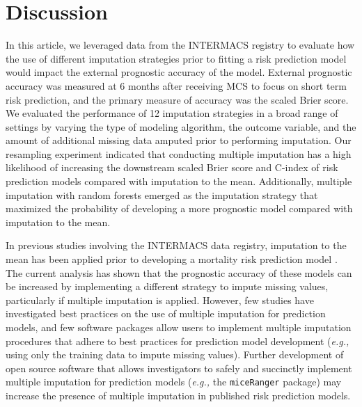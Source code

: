 \documentclass{article}
\begin{document}
\hypertarget{discussion}{%
\section{Discussion}\label{discussion}}

In this article, we leveraged data from the INTERMACS registry to
evaluate how the use of different imputation strategies prior to fitting
a risk prediction model would impact the external prognostic accuracy of
the model. External prognostic accuracy was measured at 6 months after
receiving MCS to focus on short term risk prediction, and the primary
measure of accuracy was the scaled Brier score. We evaluated the
performance of 12 imputation strategies in a broad range of settings by
varying the type of modeling algorithm, the outcome variable, and the
amount of additional missing data amputed prior to performing
imputation. Our resampling experiment indicated that conducting multiple
imputation has a high likelihood of increasing the downstream scaled
Brier score and C-index of risk prediction models compared with
imputation to the mean. Additionally, multiple imputation with random
forests emerged as the imputation strategy that maximized the
probability of developing a more prognostic model compared with
imputation to the mean.

In previous studies involving the INTERMACS data registry, imputation to
the mean has been applied prior to developing a mortality risk
prediction model
\cite{hsich2012should, cotts2014predictors, eckman2011survival, kirklin2017eighth, kormos2019society}.
The current analysis has shown that the prognostic accuracy of these
models can be increased by implementing a different strategy to impute
missing values, particularly if multiple imputation is applied. However,
few studies have investigated best practices on the use of multiple
imputation for prediction models, and few software packages allow users
to implement multiple imputation procedures that adhere to best
practices for prediction model development (\textit{e.g., }using only
the training data to impute missing values). Further development of open
source software that allows investigators to safely and succinctly
implement multiple imputation for prediction models (\textit{e.g., }the
\texttt{miceRanger} package) may increase the presence of multiple
imputation in published risk prediction models.
\end{document}
